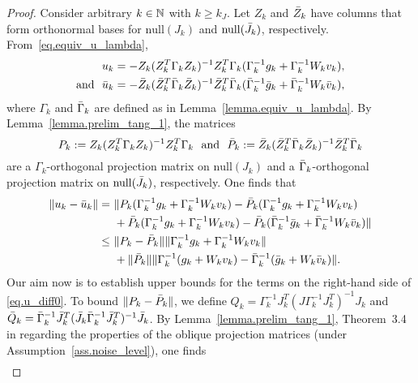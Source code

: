 \begin{proof}
  Consider arbitrary $k \in \mathbb{N}$ with $k \geq k_J$.  Let $Z_k$ and ${\bar Z}_k$ have columns that form orthonormal bases for $\mathrm{null}(J_k)$ and $\mathrm{null}({\bar J}_k)$, respectively. From~\eqref{eq.equiv_u_lambda},
  \begin{align*}
    u_k &= - Z_k (Z_k^T \Gamma_k Z_k )^{-1} Z_k^T \Gamma_k (\Gamma_k^{-1} g_k + \Gamma_k^{-1} W_k v_k), \\ \text{and}\ \ 
    \utrue_k &= - \Ztrue_k (\Ztrue_k^T \Gammatrue_k \Ztrue_k )^{-1} \Ztrue_k^T \Gammatrue_k (\Gammatrue_k^{-1}\gtrue_k + \Gammatrue_k^{-1} W_k \vtrue_k),
  \end{align*}
  where $\Gamma_k$ and ${\bar \Gamma}_k$ are defined as in Lemma~\ref{lemma.equiv_u_lambda}.  By Lemma~\ref{lemma.prelim_tang_1}, the matrices
  \begin{equation*}
    P_k := Z_k (Z_k^T \Gamma_k Z_k )^{-1} Z_k^T \Gamma_k\ \ \text{and}\ \ {\bar P}_k := {\bar Z}_k ({\bar Z}_k^T {\bar \Gamma}_k {\bar Z}_k)^{-1} {\bar Z}_k^T {\bar \Gamma}_k
  \end{equation*}
  are a $\Gamma_k$-orthogonal projection matrix on $\mathrm{null}(J_k)$ and a ${\bar \Gamma}_k$-orthogonal projection matrix on $\mathrm{null}({\bar J}_k)$, respectively.  One finds that
  \begin{align}
    \| u_k - {\bar u}_k \|
      =&\ \|P_k (\Gamma_k^{-1} g_k + \Gamma_k^{-1} W_k v_k) - {\bar P}_k (\Gamma_k^{-1} g_k + \Gamma_k^{-1} W_k v_k) \nonumber \\
      &\ + {\bar P}_k ( \Gamma_k^{-1}g_k+  \Gamma_k^{-1} W_k v_k) - {\bar P}_k ({\bar \Gamma}_k^{-1} {\bar g}_k + {\bar \Gamma}_k^{-1} W_k {\bar v}_k)\| \nonumber \\
      \leq&\ \|P_k - {\bar P}_k \| \| \Gamma_k^{-1} g_k +  \Gamma_k^{-1} W_k v_k \| \label{eq.u_diff0} \\
      &\ + \| {\bar P}_k \| \|\Gamma_k^{-1}(g_k+   W_k v_k) -  {\bar \Gamma}_k^{-1} ({\bar g}_k +  W_k {\bar v}_k) \|. \nonumber
  \end{align}
  Our aim now is to establish upper bounds for the terms on the right-hand side of \eqref{eq.u_diff0}.  To bound $\|P_k - {\bar P}_k \| $, we define $Q_k = \Gamma_k^{-1} J_k^T (J \Gamma_k^{-1}J_k^T)^{-1} J_k $ and ${\bar Q}_k = {\bar \Gamma}_k^{-1} {\bar J}_k^T ({\bar J}_k {\bar \Gamma}_k^{-1}{\bar J}_k^T)^{-1} {\bar J}_k$.  By Lemma~\ref{lemma.prelim_tang_1}, Theorem~3.4 in \cite{stewart2011numerical} regarding the properties of the oblique projection matrices (under Assumption~\ref{ass.noise_level}), one finds
  \begin{align}

\end{align}
\end{proof}
